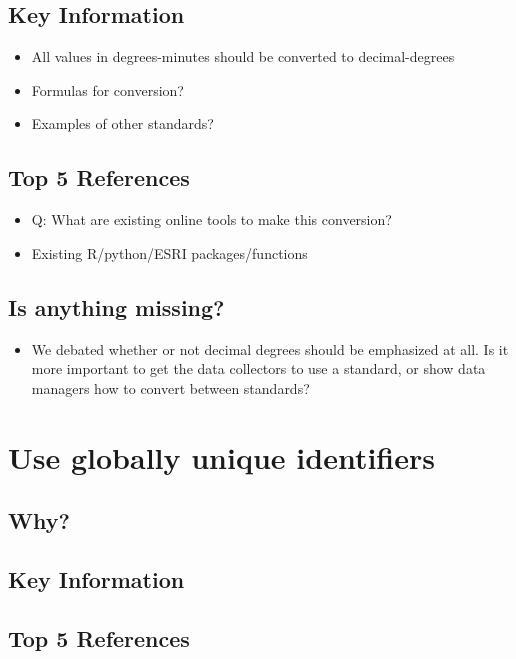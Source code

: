 \documentclass[
  oneside]{book}
\providecommand{\tightlist}{%
  \setlength{\itemsep}{0pt}\setlength{\parskip}{0pt}}
\begin{document}
\hypertarget{key-information-4}{%
\subsection{Key Information}\label{key-information-4}}

\begin{itemize}
\tightlist
\item
  All values in degrees-minutes should be converted to decimal-degrees
\item
  Formulas for conversion?
\item
  Examples of other standards?
\end{itemize}

\hypertarget{top-5-references-4}{%
\subsection{Top 5 References}\label{top-5-references-4}}

\begin{itemize}
\tightlist
\item
  Q: What are existing online tools to make this conversion?
\item
  Existing R/python/ESRI packages/functions
\end{itemize}

\hypertarget{is-anything-missing-4}{%
\subsection{Is anything missing?}\label{is-anything-missing-4}}

\begin{itemize}
\tightlist
\item
  We debated whether or not decimal degrees should be emphasized at all. Is it more important to get the data collectors to use a standard, or show data managers how to convert between standards?
\end{itemize}

\hypertarget{use-globally-unique-identifiers}{%
\section{Use globally unique identifiers}\label{use-globally-unique-identifiers}}

\hypertarget{why-5}{%
\subsection{Why?}\label{why-5}}

\hypertarget{key-information-5}{%
\subsection{Key Information}\label{key-information-5}}

\hypertarget{top-5-references-5}{%
\subsection{Top 5 References}\label{top-5-references-5}}
\end{document}

